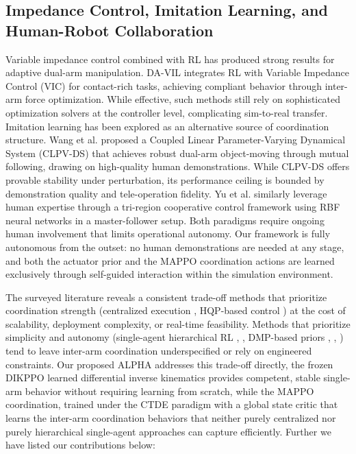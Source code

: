 \documentclass[lettersize,journal]{IEEEtran}
\begin{document}
\subsection{Impedance Control, Imitation Learning, and Human-Robot Collaboration}
Variable impedance control combined with RL has produced strong results for adaptive dual-arm manipulation.
DA-VIL \cite{related-49} integrates RL with Variable Impedance Control (VIC) for contact-rich tasks, achieving compliant behavior through inter-arm force optimization. While effective, such methods still rely on sophisticated optimization solvers at the controller level, complicating sim-to-real transfer. Imitation learning has been explored as an alternative source of coordination structure. Wang et al. \cite{related-50} proposed a Coupled Linear Parameter-Varying Dynamical System (CLPV-DS) that achieves robust dual-arm object-moving through mutual following, drawing on high-quality human demonstrations. While CLPV-DS offers provable stability under perturbation, its performance ceiling is bounded by demonstration quality and tele-operation fidelity. Yu et al. \cite{related-51} similarly leverage human expertise through a tri-region cooperative control framework using RBF neural networks in a master-follower setup. Both paradigms require ongoing human involvement that limits operational autonomy. Our framework is fully autonomous from the outset: no human demonstrations are needed at any stage, and both the actuator prior and the MAPPO coordination actions are learned exclusively through self-guided interaction within the simulation environment.

The surveyed literature reveals a consistent trade-off methods that prioritize coordination strength (centralized execution \cite{related-43}, HQP-based control \cite{related-48}) at the cost of scalability, deployment complexity, or real-time feasibility. Methods that prioritize simplicity and autonomy (single-agent hierarchical RL \cite{related-38}, \cite{related-37}, DMP-based priors \cite{related-40}, \cite{related-41}, \cite{related-42}) tend to leave inter-arm coordination underspecified or rely on engineered constraints. Our proposed ALPHA addresses this trade-off directly, the frozen DIKPPO learned differential inverse kinematics provides competent, stable single-arm behavior without requiring learning from scratch, while the MAPPO coordination, trained under the CTDE paradigm with a global state critic that learns the inter-arm coordination behaviors that neither purely centralized nor purely hierarchical single-agent approaches can capture efficiently. Further we have listed our contributions below:
\end{document}
